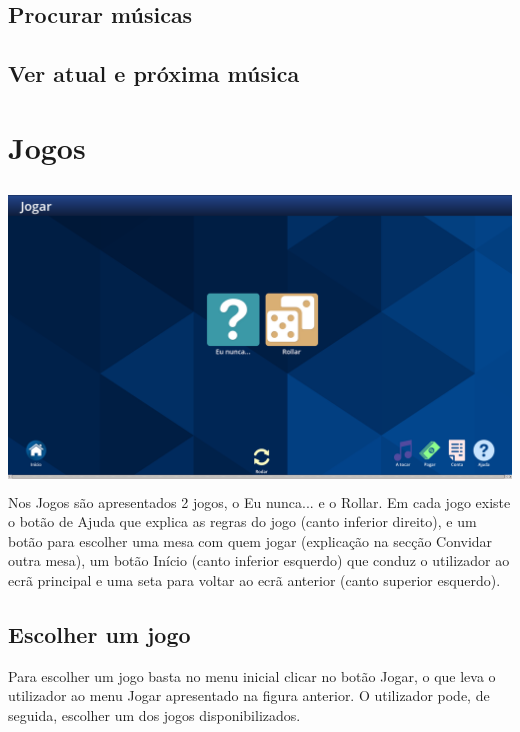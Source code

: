 \documentclass{article}
\begin{document}
\subsection{Procurar músicas}

\subsection{Ver atual e próxima música}

\section{Jogos}
\includegraphics[width=15cm, height=8cm]{user_manual_images/games_menu.png}
Nos Jogos são apresentados 2 jogos, o Eu nunca... e o Rollar.
Em cada jogo existe o botão de Ajuda que explica as regras do jogo (canto inferior direito), e um botão para escolher uma mesa com quem jogar (explicação na secção Convidar outra mesa), um botão Início (canto inferior esquerdo) que conduz o utilizador ao ecrã principal e uma seta para voltar ao ecrã anterior (canto superior esquerdo).
\subsection{Escolher um jogo}
Para escolher um jogo basta no menu inicial clicar no botão Jogar, o que leva o utilizador ao menu Jogar apresentado na figura anterior.
O utilizador pode, de seguida, escolher um dos jogos disponibilizados.
\end{document}

